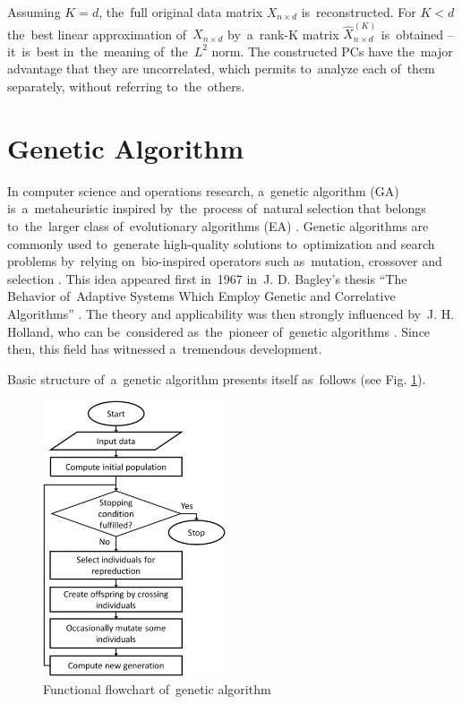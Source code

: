 Assuming $K = d$, the~full original data matrix $X_{n×d}$ is~reconstructed. For $K < d$ the~best linear approximation of~$X_{n×d}$ by~a~rank-K matrix $\hat{X}_{n×d}^{(K)}$ is~obtained – it~is~best in~the~meaning of~the~$L^2$ norm. The constructed PCs have the~major advantage that they are uncorrelated, which permits to~analyze each of~them separately, without referring to~the~others.



\section{Genetic Algorithm}\label{GA}

In computer science and operations research, a~genetic algorithm (GA) is~a~metaheuristic inspired by~the~process of~natural selection that belongs to~the~larger class of~evolutionary algorithms (EA) \cite{darwin2008origin}. Genetic algorithms are commonly used to~generate high-quality solutions to~optimization and search problems by~relying on~bio-inspired operators such as~mutation, crossover and selection \cite{mitchell1998introduction}. This idea appeared first in~1967 in~J. D. Bagley’s thesis “The Behavior of~Adaptive Systems Which Employ Genetic and Correlative Algorithms” \cite{bagley1967behavior}. The theory and applicability was then strongly influenced by~J. H. Holland, who can be~considered as~the~pioneer of~genetic algorithms \cite{holland1992adaptation,holland1989induction}. Since then, this field has witnessed a~tremendous development.

Basic structure of~a~genetic algorithm presents itself as~follows (see Fig. \ref{fig:block}).

\begin{figure}[ht!]
\centering
\includegraphics[width=0.48\textwidth]{wykresy/block.png}
\caption{Functional flowchart of~genetic algorithm}
\label{fig:block}
\end{figure}

